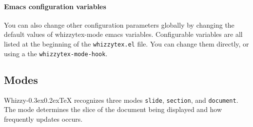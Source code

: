 \documentclass{article}
\makeatletter
\let \lst \verb
\def \whizzy {{Whizzy\kern -0.3ex\raise 0.2ex\hbox{\let \@\relax\TeX}}}
\makeatother
\begin{document}
\paragraph {Emacs configuration variables}

You can also change other configuration parameters globally by changing the
default values of whizzytex-mode emacs variables. 
Configurable variables are all listed at the beginning of the
\lst"whizzytex.el" file. You can change them directly, or using a 
the \lst"whizzytex-mode-hook". 


\subsection {Modes} 
\label {modes}

{\whizzy} recognizes three modes \lst"slide", \lst"section", and \lst"document". 
The mode determines the slice of the document being displayed and how
frequently updates occurs. 
\end{document}
